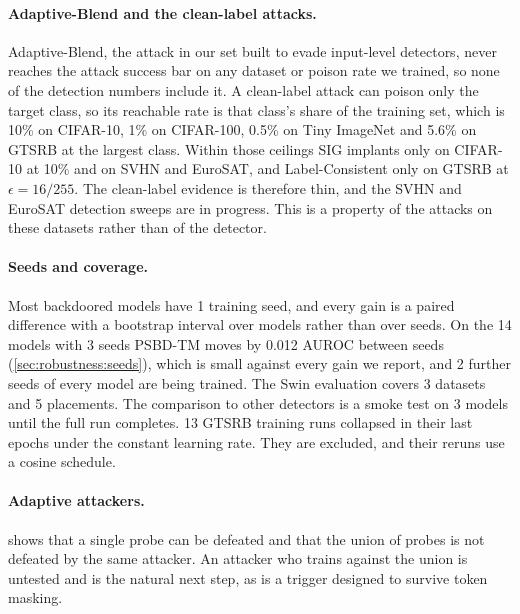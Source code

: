 \paragraph{Adaptive-Blend and the clean-label attacks.}
Adaptive-Blend, the attack in our set built to evade input-level detectors, never reaches the attack success bar on any dataset or poison rate we trained, so none of the detection numbers include it. A clean-label attack can poison only the target class, so its reachable rate is that class's share of the training set, which is 10\% on CIFAR-10, 1\% on CIFAR-100, 0.5\% on Tiny ImageNet and 5.6\% on GTSRB at the largest class. Within those ceilings SIG implants only on CIFAR-10 at 10\% and on SVHN and EuroSAT, and Label-Consistent only on GTSRB at $\epsilon = 16/255$. The clean-label evidence is therefore thin, and the SVHN and EuroSAT detection sweeps are in progress. This is a property of the attacks on these datasets rather than of the detector.

\paragraph{Seeds and coverage.}
Most backdoored models have 1 training seed, and every gain is a paired difference with a bootstrap interval over models rather than over seeds. On the 14 models with 3 seeds PSBD-TM moves by 0.012 AUROC between seeds (\cref{sec:robustness:seeds}), which is small against every gain we report, and 2 further seeds of every model are being trained. The Swin evaluation covers 3 datasets and 5 placements. The comparison to other detectors is a smoke test on 3 models until the full run completes. 13 GTSRB training runs collapsed in their last epochs under the constant learning rate. They are excluded, and their reruns use a cosine schedule.

\paragraph{Adaptive attackers.}
 shows that a single probe can be defeated and that the union of probes is not defeated by the same attacker. An attacker who trains against the union is untested and is the natural next step, as is a trigger designed to survive token masking.
